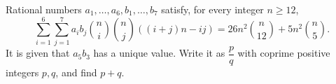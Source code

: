 Rational numbers $a_1,\ldots,a_6,b_1,\ldots,b_7$ satisfy, for every integer $n\ge12$,
\[\sum_{i=1}^6\sum_{j=1}^7a_i b_j\binom ni\binom nj((i+j)n-ij)=26n^2\binom n{12}+5n^2\binom n5.\]
It is given that $a_5b_3$ has a unique value. Write it as $\dfrac{p}{q}$ with coprime positive integers $p,q$, and find $p+q$.

